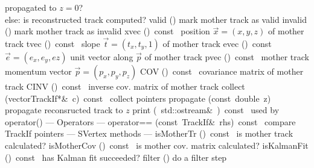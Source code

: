 \documentclass{article}
\begin{document}
\begin{cxxentry}
\begin{cxxclass}
\begin{cxxpublic}
{propagated to $z=0$?\\
else: is reconstructed track computed?}
        {}
\label{cxx.2.1.71}
        {valid}
        {()}
        { mark mother track as valid}
        {}
\label{cxx.2.1.72}
        {invalid}
        {()}
        { mark mother track as invalid}
        {}
\label{cxx.2.1.73}
        {xvec}
        {()\ const\ }
        { position $\vec{x} = (x,y,z)$ of mother track}
        {}
\label{cxx.2.1.74}
        {tvec}
        {()\ const\ }
        { slope $\vec{t} = (t_x,t_y,1)$ of mother track}
        {}
\label{cxx.2.1.75}
        {evec}
        {()\ const\ }
        { $\vec{e} = (e_x,e_y,ez)$ unit vector along $\vec{p}$ of mother track}
        {}
\label{cxx.2.1.76}
        {pvec}
        {()\ const\ }
        { mother track momentum vector $\vec{p} = (p_x,p_y,p_z)$}
        {}
\label{cxx.2.1.77}
        {COV}
        {()\ const\ }
        { covariance matrix of mother track}
        {}
\label{cxx.2.1.78}
        {CINV}
        {()\ const\ }
        { inverse cov. matrix of mother track}
        {}
\label{cxx.2.1.79}
        {collect}
        {(vector\<TrackIf*\>\&\ c)\ const\ }
        { collect pointers}
        {}
\label{cxx.2.1.80}
        {propagate}
        {(const\ double\ z)}
        { propagate reconsructed track to $z$}
        {}
\label{cxx.2.1.81}
        {print}
        {(\ std::ostream\&\ )\ const\ }
        { used by operator\<\<()}
        {}
\label{cxx.2.1.82}
\cxxitem{}
        {--- Operators --- }
        {}
        {}
        {}
\label{cxx.2.1.83}
        {operator==}
        {(const\ TrackIf\&\ rhs)\ const\ }
        { compare TrackIf pointers}
        {}
\label{cxx.2.1.84}
\cxxitem{}
        {--- SVertex methods --- }
        {}
        {}
        {}
\label{cxx.2.1.85}
        {isMotherTr}
        {()\ const\ }
        { is mother track calculated?}
        {}
\label{cxx.2.1.86}
        {isMotherCov}
        {()\ const\ }
        { is mother cov. matrix calculated?}
        {}
\label{cxx.2.1.87}
        {isKalmanFit}
        {()\ const\ }
        { has Kalman fit succeeded?}
        {}
\label{cxx.2.1.88}
        {filter}
        {()}
        { do a filter step}
        {}
\label{cxx.2.1.89}

\end{cxxpublic}
\end{cxxclass}
\end{cxxentry}
\end{document}

